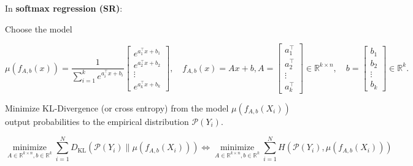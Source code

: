 \documentclass{report}
\begin{document}
\begin{definition}
    In \textbf{softmax regression (SR)}:

    Choose the model

    $$
    \mu\left(f_{A, b}(x)\right)=\frac{1}{\sum_{i=1}^{k} e^{a_{i}^{\top} x+b_{i}}}\left[\begin{array}{c}
    e^{a_{1}^{\top} x+b_{1}} \\
    e^{a_{2}^{\top} x+b_{2}} \\
    \vdots \\
    e^{a_{k}^{\top} x+b_{k}}
    \end{array}\right], \quad f_{A, b}(x)=A x+b, A=\left[\begin{array}{c}
    a_{1}^{\top} \\
    a_{2}^{\top} \\
    \vdots \\
    a_{k}^{\top}
    \end{array}\right] \in \mathbb{R}^{k \times n}, \quad b=\left[\begin{array}{c}
    b_{1} \\
    b_{2} \\
    \vdots \\
    b_{k}
    \end{array}\right] \in \mathbb{R}^{k} .
    $$

    Minimize KL-Divergence (or cross entropy) from the model $\mu\left(f_{A, b}\left(X_{i}\right)\right)$ output probabilities to the empirical distribution $\mathcal{P}\left(Y_{i}\right)$.

    $$
    \underset{A \in \mathbb{R}^{k \times n}, b \in \mathbb{R}^{k}}{\operatorname{minimize}} \sum_{i=1}^{N} D_{\mathrm{KL}}\left(\mathcal{P}\left(Y_{i}\right) \| \mu\left(f_{A, b}\left(X_{i}\right)\right)\right) \Longleftrightarrow \underset{A \in \mathbb{R}^{k \times n}, b \in \mathbb{R}^{k}}{\operatorname{minimize}} \sum_{i=1}^{N} H\left(\mathcal{P}\left(Y_{i}\right), \mu\left(f_{A, b}\left(X_{i}\right)\right)\right)
    $$
\end{definition}
\end{document}
